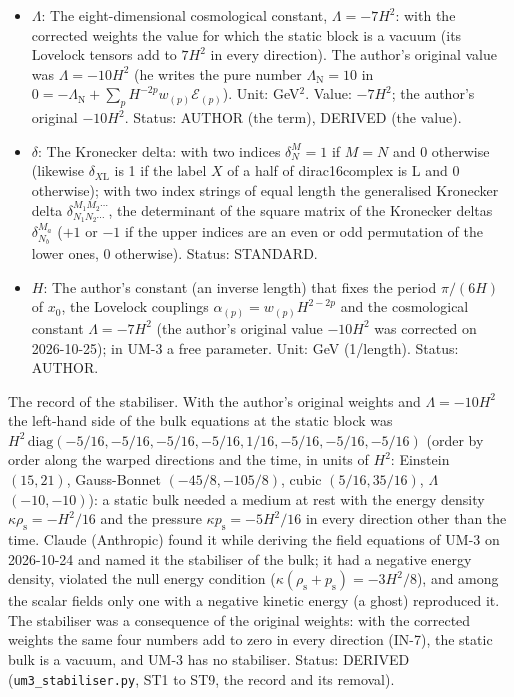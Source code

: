 \documentclass[
  10pt,
]{article}
\begin{document}
\begin{itemize}
  variation of \(\sqrt{\lvert g\rvert}\,\mathcal{L}_{(p)}\) with respect
  to \(g^{MN}\); \(\mathcal{E}_{(1)}\) the Einstein tensor,
  \(\mathcal{E}_{(2)}\) the Gauss-Bonnet tensor, \(\mathcal{E}_{(3)}\)
  the cubic Lovelock tensor); with frame indices its frame components.
  Unit: 1/length\(^{2p}\). Status: STANDARD.
\item
  \(\Lambda\): The eight-dimensional cosmological constant,
  \(\Lambda = -7H^2\): with the corrected weights the value for which
  the static block is a vacuum (its Lovelock tensors add to \(7H^2\) in
  every direction). The author's original value was \(\Lambda = -10H^2\)
  (he writes the pure number \(\Lambda_{\mathrm{N}} = 10\) in
  \(0 = -\Lambda_{\mathrm{N}} + \sum_p H^{-2p}w_{(p)}\mathcal{E}_{(p)}\)).
  Unit: GeV\(^2\). Value: \(-7H^2\); the author's original \(-10H^2\).
  Status: AUTHOR (the term), DERIVED (the value).
\item
  \(\delta\): The Kronecker delta: with two indices \(\delta^M_N = 1\)
  if \(M = N\) and 0 otherwise (likewise \(\delta_{X\mathrm{L}}\) is 1
  if the label \(X\) of a half of dirac16complex is L and 0 otherwise);
  with two index strings of equal length the generalised Kronecker delta
  \(\delta^{M_1M_2\cdots}_{N_1N_2\cdots}\), the determinant of the
  square matrix of the Kronecker deltas \(\delta^{M_a}_{N_b}\) (\(+1\)
  or \(-1\) if the upper indices are an even or odd permutation of the
  lower ones, 0 otherwise). Status: STANDARD.
\item
  \(H\): The author's constant (an inverse length) that fixes the period
  \(\pi/(6H)\) of \(x_0\), the Lovelock couplings
  \(\alpha_{(p)} = w_{(p)}H^{2-2p}\) and the cosmological constant
  \(\Lambda = -7H^2\) (the author's original value \(-10H^2\) was
  corrected on 2026-10-25); in UM-3 a free parameter. Unit: GeV
  (1/length). Status: AUTHOR.
\end{itemize}

The record of the stabiliser. With the author's original weights and
\(\Lambda = -10H^2\) the left-hand side of the bulk equations at the
static block was
\(H^2\,\mathrm{diag}(-5/16, -5/16, -5/16, -5/16, 1/16, -5/16, -5/16, -5/16)\)
(order by order along the warped directions and the time, in units of
\(H^2\): Einstein \((15, 21)\), Gauss-Bonnet \((-45/8, -105/8)\), cubic
\((5/16, 35/16)\), \(\Lambda\) \((-10, -10)\)): a static bulk needed a
medium at rest with the energy density
\(\kappa\rho_{\mathrm{s}} = -H^2/16\) and the pressure
\(\kappa p_{\mathrm{s}} = -5H^2/16\) in every direction other than the
time. Claude (Anthropic) found it while deriving the field equations of
UM-3 on 2026-10-24 and named it the stabiliser of the bulk; it had a
negative energy density, violated the null energy condition
(\(\kappa(\rho_{\mathrm{s}} + p_{\mathrm{s}}) = -3H^2/8\)), and among
the scalar fields only one with a negative kinetic energy (a ghost)
reproduced it. The stabiliser was a consequence of the original weights:
with the corrected weights the same four numbers add to zero in every
direction (IN-7), the static bulk is a vacuum, and UM-3 has no
stabiliser. Status: DERIVED (\texttt{um3\_stabiliser.py}, ST1 to ST9,
the record and its removal).
\end{document}
